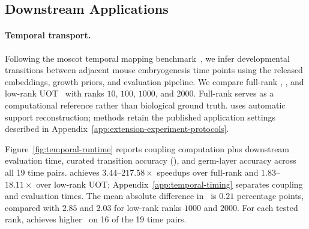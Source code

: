 \subsection{Downstream Applications}
\label{sec:downstream-applications}

\paragraph{Temporal transport.}
Following the moscot temporal mapping benchmark~\citep{klein2025mapping}, we infer developmental transitions between adjacent mouse embryogenesis time points using the released embeddings, growth priors, and evaluation pipeline.
We compare full-rank \sinkhorn, \ourssparsink, and low-rank UOT~\citep{scetbon2023unbalanced} with ranks $10$, $100$, $1000$, and $2000$.
Full-rank \sinkhorn serves as a computational reference rather than biological ground truth.
\ourssparsink uses automatic support reconstruction; methods retain the published application settings described in Appendix~\ref{app:extension-experiment-protocols}.

Figure~\ref{fig:temporal-runtime} reports coupling computation plus downstream evaluation time, curated transition accuracy (\transitionacc), and germ-layer accuracy across all 19 time pairs.
\ourssparsink achieves $3.44$--$217.58\times$ speedups over full-rank \sinkhorn and $1.83$--$18.11\times$ over low-rank UOT; Appendix~\ref{app:temporal-timing} separates coupling and evaluation times.
The mean absolute difference in \transitionacc\ is $0.21$ percentage points, compared with $2.85$ and $2.03$ for low-rank ranks $1000$ and $2000$.
For each tested rank, \ourssparsink achieves higher \transitionacc\ on 16 of the 19 time pairs.

